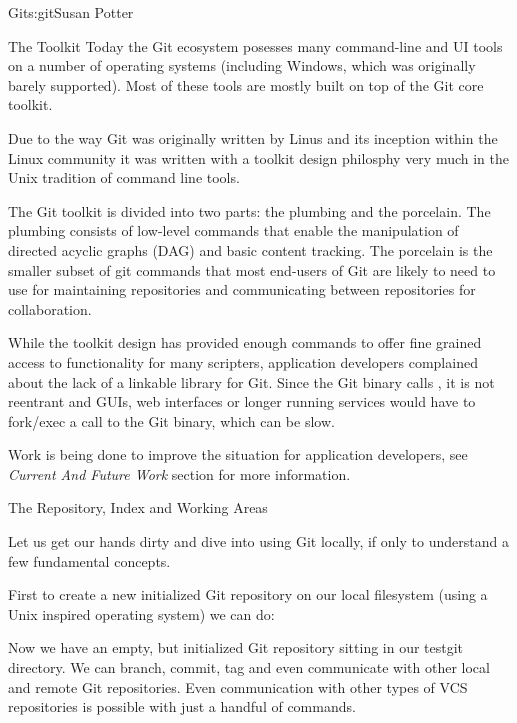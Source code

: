 \begin{aosachapter}{Git}{s:git}{Susan Potter}
\begin{aosasect1}{The Toolkit}
Today the Git ecosystem posesses many command-line and UI tools on a number
of operating systems (including Windows, which was originally barely
supported). Most of these tools are mostly built on top of the Git core
toolkit.

Due to the way Git was originally written by Linus and its inception within
the Linux community it was written with a toolkit design philosphy very much
in the Unix tradition of command line tools.

The Git toolkit is divided into two parts: the plumbing and
the porcelain. The plumbing consists of low-level commands that enable
the manipulation of directed acyclic graphs (DAG) and basic content
tracking. The porcelain is the smaller subset of git commands that most
end-users of Git are likely to need to use for maintaining repositories and
communicating between repositories for collaboration.

While the toolkit design has provided enough commands to offer fine grained
access to functionality for many scripters, application developers
complained about the lack of a linkable library for Git. Since the Git binary
calls , it is not reentrant and GUIs, web interfaces or longer
running services would have to fork/exec a call to the Git binary, which can
be slow.

Work is being done to improve the situation for application developers, see
\emph{Current And Future Work} section for more information.
\end{aosasect1}

\begin{aosasect1}{The Repository, Index and Working Areas}

Let us get our hands dirty and dive into using Git locally, if only to
understand a few fundamental concepts.

First to create a new initialized Git repository on our local filesystem
(using a Unix inspired operating system) we can do:
\begin{aosaitemize}
  \item {}
  \item {}
  \item {}
\end{aosaitemize}

Now we have an empty, but initialized Git repository sitting in our testgit
directory. We can branch, commit, tag and even communicate with other local
and remote Git repositories. Even communication with other types of VCS
repositories is possible with just a handful of  commands.


\end{aosasect1}
\end{aosachapter}
